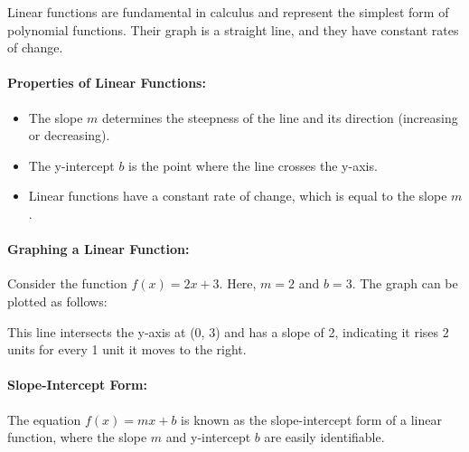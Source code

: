 \documentclass[a4paper,12pt]{book}
\begin{document}
Linear functions are fundamental in calculus and represent the simplest form of polynomial functions. Their graph is a straight line, and they have constant rates of change.

\paragraph{Properties of Linear Functions:}
\begin{itemize}
    \item The slope \( m \) determines the steepness of the line and its direction (increasing or decreasing).
    \item The y-intercept \( b \) is the point where the line crosses the y-axis.
    \item Linear functions have a constant rate of change, which is equal to the slope \( m \).
\end{itemize}

\paragraph{Graphing a Linear Function:}
Consider the function \( f(x) = 2x + 3 \). Here, \( m = 2 \) and \( b = 3 \). The graph can be plotted as follows:


This line intersects the y-axis at (0, 3) and has a slope of 2, indicating it rises 2 units for every 1 unit it moves to the right.

\paragraph{Slope-Intercept Form:}
The equation \( f(x) = mx + b \) is known as the slope-intercept form of a linear function, where the slope \( m \) and y-intercept \( b \) are easily identifiable.
\end{document}
